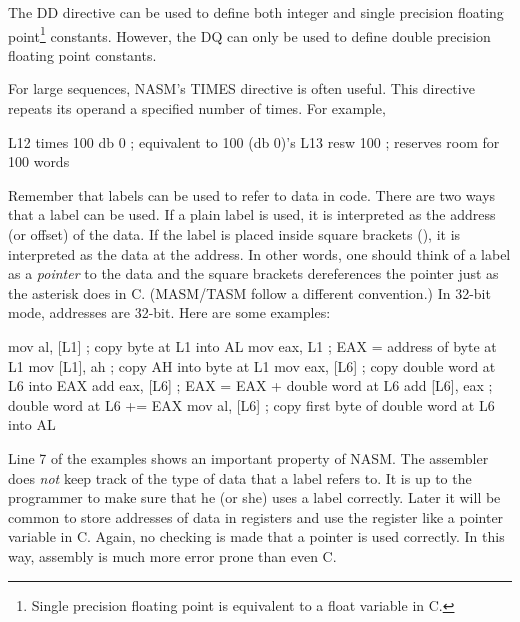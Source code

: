 The {\code DD} directive can be used to define
both integer and single precision floating point\footnote{Single
precision floating point is equivalent to a {\code float} variable in
C.} constants. However, the {\code DQ} can only
be used to define double precision floating point constants.

For large sequences, NASM's {\code TIMES} 
directive is often useful. This directive repeats its operand a
specified number of times. For example,
\begin{AsmCodeListing}[frame=none, numbers=none]
L12   times 100 db 0                 ; equivalent to 100 (db 0)'s
L13   resw   100                     ; reserves room for 100 words
\end{AsmCodeListing}

Remember that labels  can be used to refer to data in code. There are
two ways that a label can be used. If a plain label is used, it is
interpreted as the address (or offset) of the data. If the label is
placed inside square brackets ({\code []}), it is interpreted as the data at
the address. In other words, one should think of a label as a \emph{pointer}
to the data and the square brackets dereferences the pointer just as
the asterisk does in C. (MASM/TASM follow a different convention.) 
In 32-bit mode, addresses are 32-bit. Here are some examples:
\begin{AsmCodeListing}[frame=none]
      mov    al, [L1]      ; copy byte at L1 into AL
      mov    eax, L1       ; EAX = address of byte at L1
      mov    [L1], ah      ; copy AH into byte at L1
      mov    eax, [L6]     ; copy double word at L6 into EAX
      add    eax, [L6]     ; EAX = EAX + double word at L6
      add    [L6], eax     ; double word at L6 += EAX
      mov    al, [L6]      ; copy first byte of double word at L6 into AL
\end{AsmCodeListing}
Line 7 of the examples shows an important property of NASM. The assembler does
\emph{not} keep track of the type of data that a label refers to. It is up
to the programmer to make sure that he (or she) uses a label correctly. Later
it will be common to store addresses of data in registers and use the register
like a pointer variable in C. Again, no checking is made that a pointer is
used correctly. In this way, assembly is much more error prone than even C.

